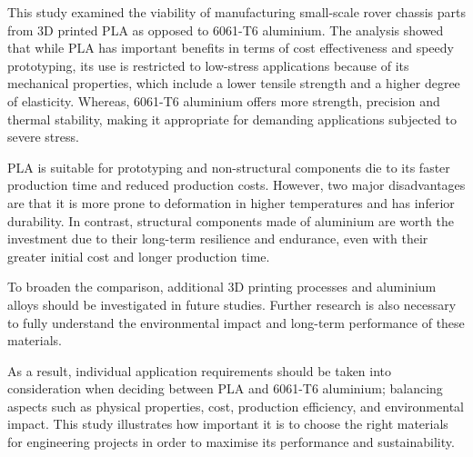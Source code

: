 This study examined the viability of manufacturing small-scale rover chassis parts from 3D printed PLA as
opposed to 6061-T6 aluminium. The analysis showed that while PLA has important benefits in terms of
cost effectiveness and speedy prototyping, its use is restricted to low-stress applications because of its
mechanical properties, which include a lower tensile strength and a higher degree of elasticity. Whereas,
6061-T6 aluminium offers more strength, precision and thermal stability, making it appropriate for
demanding applications subjected to severe stress.

PLA is suitable for prototyping and non-structural components die to its faster production time and
reduced production costs. However, two major disadvantages are that it is more prone to deformation in
higher temperatures and has inferior durability. In contrast, structural components made of aluminium are
worth the investment due to their long-term resilience and endurance, even with their greater initial cost
and longer production time.

To broaden the comparison, additional 3D printing processes and aluminium alloys should be investigated
in future studies. Further research is also necessary to fully understand the environmental impact and
long-term performance of these materials.

As a result, individual application requirements should be taken into consideration when deciding between
PLA and 6061-T6 aluminium; balancing aspects such as physical properties, cost, production efficiency,
and environmental impact. This study illustrates how important it is to choose the right materials for
engineering projects in order to maximise its performance and sustainability.